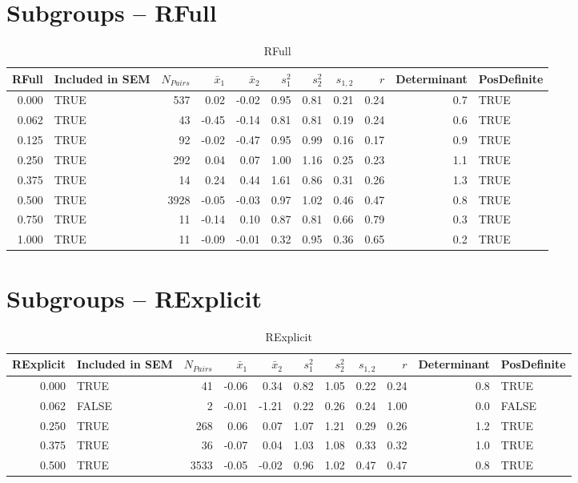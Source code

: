 \documentclass{article}\usepackage[]{graphicx}\usepackage[]{color}
\begin{document}
\section{Subgroups --  RFull }%
\begin{table}[ht]
\centering
\begin{tabular}{rlrrrrrrrrl}
  \hline
RFull & Included in SEM & $N_{Pairs}$ & $\bar{x}_1$ & $\bar{x}_2$ & $s_1^2$ & $s_2^2$ & $s_{1,2}$ & $r$ & Determinant & PosDefinite \\ 
  \hline
0.000 & TRUE & 537 & 0.02 & -0.02 & 0.95 & 0.81 & 0.21 & 0.24 & 0.7 & TRUE \\ 
  0.062 & TRUE & 43 & -0.45 & -0.14 & 0.81 & 0.81 & 0.19 & 0.24 & 0.6 & TRUE \\ 
  0.125 & TRUE & 92 & -0.02 & -0.47 & 0.95 & 0.99 & 0.16 & 0.17 & 0.9 & TRUE \\ 
  0.250 & TRUE & 292 & 0.04 & 0.07 & 1.00 & 1.16 & 0.25 & 0.23 & 1.1 & TRUE \\ 
  0.375 & TRUE & 14 & 0.24 & 0.44 & 1.61 & 0.86 & 0.31 & 0.26 & 1.3 & TRUE \\ 
  0.500 & TRUE & 3928 & -0.05 & -0.03 & 0.97 & 1.02 & 0.46 & 0.47 & 0.8 & TRUE \\ 
  0.750 & TRUE & 11 & -0.14 & 0.10 & 0.87 & 0.81 & 0.66 & 0.79 & 0.3 & TRUE \\ 
  1.000 & TRUE & 11 & -0.09 & -0.01 & 0.32 & 0.95 & 0.36 & 0.65 & 0.2 & TRUE \\ 
   \hline
\end{tabular}
\caption{RFull} 
\end{table}
\section{Subgroups --  RExplicit }%
\begin{table}[ht]
\centering
\begin{tabular}{rlrrrrrrrrl}
  \hline
RExplicit & Included in SEM & $N_{Pairs}$ & $\bar{x}_1$ & $\bar{x}_2$ & $s_1^2$ & $s_2^2$ & $s_{1,2}$ & $r$ & Determinant & PosDefinite \\ 
  \hline
0.000 & TRUE & 41 & -0.06 & 0.34 & 0.82 & 1.05 & 0.22 & 0.24 & 0.8 & TRUE \\ 
  0.062 & FALSE & 2 & -0.01 & -1.21 & 0.22 & 0.26 & 0.24 & 1.00 & 0.0 & FALSE \\ 
  0.250 & TRUE & 268 & 0.06 & 0.07 & 1.07 & 1.21 & 0.29 & 0.26 & 1.2 & TRUE \\ 
  0.375 & TRUE & 36 & -0.07 & 0.04 & 1.03 & 1.08 & 0.33 & 0.32 & 1.0 & TRUE \\ 
  0.500 & TRUE & 3533 & -0.05 & -0.02 & 0.96 & 1.02 & 0.47 & 0.47 & 0.8 & TRUE \\ 
   \hline
\end{tabular}
\caption{RExplicit} 
\end{table}
\end{document}
